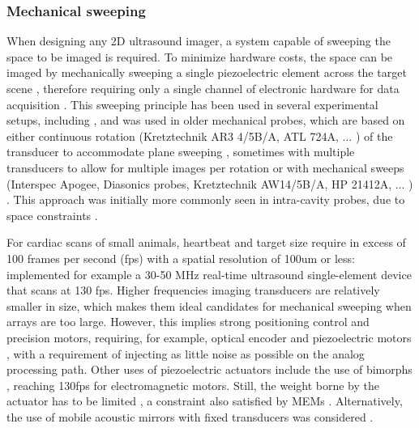 \documentclass{article}
\begin{document}
\subsubsection{Mechanical sweeping}

When designing any 2D ultrasound imager, a system capable of sweeping the space to be imaged is required. To minimize hardware costs, the space can be imaged by mechanically sweeping a single piezoelectric element across the target scene \cite{shaw_mechanical_1977,matzuk_novel_1978,wilkinson_principles_1981}, therefore requiring only a single channel of electronic hardware for data acquisition  \cite{saijo_development_nodate}. This sweeping principle has been used in several experimental setups, including \cite{chang_low-cost_2009}, and was used in older mechanical probes, which are based on either continuous rotation (Kretztechnik AR3 4/5B/A, ATL 724A, ... ) of the transducer to accommodate plane sweeping \cite{holm_new_1975}, sometimes with multiple transducers to allow for multiple images per rotation or with mechanical sweeps (Interspec Apogee, Diasonics probes, Kretztechnik AW14/5B/A, HP 21412A, ... ) \cite{jonveaux_review_2019}. This approach was initially more commonly seen in intra-cavity probes, due to space constraints \cite{hisanaga_high_1980}. 

For cardiac scans of small animals, heartbeat and target size require in excess of 100 frames per second (fps) with a spatial resolution of 100um or less:  \cite{lei_high-frame_nodate} implemented for example a 30-50 MHz real-time ultrasound single-element device that scans at 130 fps. Higher frequencies imaging transducers are  relatively smaller in size, which makes them ideal candidates for mechanical sweeping when arrays are too large. However, this implies strong positioning control and precision motors, requiring, for example, optical encoder and  piezoelectric motors \cite{carotenuto_very_2004}, with a requirement of injecting as little noise as possible on the analog processing path. Other uses of piezoelectric actuators include the use of bimorphs \cite{bezanson_low-cost_2011}, reaching 130fps for electromagnetic motors. Still, the weight borne by the actuator has to be limited \cite{brown_low_2013, huang_novel_2015}, a constraint also satisfied by MEMs \cite{choi_versatile_2020}. Alternatively, the use of mobile acoustic mirrors with fixed transducers was considered \cite{havlice_medical_1979}.
\end{document}
